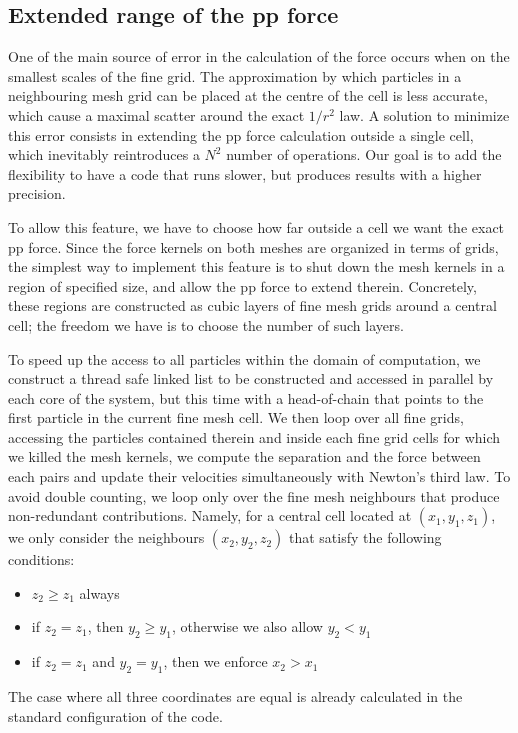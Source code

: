 \subsection{Extended range of the pp force}
\label{subsec:extendedpp}

One of the main source of error in the calculation of the force occurs when on the smallest scales of the fine grid.
The approximation by which particles in a neighbouring mesh grid can be placed at the centre of the cell
is less accurate, which cause a maximal scatter around the exact $1/r^2$ law.
A solution to minimize this error consists in extending the pp force calculation outside a single cell,
which inevitably reintroduces a $N^2$ number of operations. Our goal is to add the flexibility to have a code
that runs slower, but produces results with a higher precision. 

To allow this feature, we  have to choose how far outside a cell we want the exact pp force.  
Since the force kernels on both meshes are organized in terms of grids, the simplest way to implement this 
feature is to shut down the mesh kernels in a region of specified size, and allow the pp force to extend therein.
Concretely, these regions are constructed as cubic layers of fine mesh grids around a central cell; 
the freedom we have is to choose the number of such layers.
 
 To speed up the access to all particles within the domain of computation, we construct a thread safe linked list
 to be constructed and accessed in parallel by each core of the system, but this time with a head-of-chain that points to the first particle in the current fine mesh cell. We then loop over all fine grids, accessing the particles contained therein and inside each fine grid cells for which we killed the mesh kernels,
 we compute the separation and the force between each pairs and update their velocities simultaneously with Newton's third law. 
 To avoid double counting, we loop only over the fine mesh neighbours that produce non-redundant contributions. Namely, for a central cell located at 
 $(x_1, y_1, z_1)$, we only consider the neighbours $(x_2, y_2, z_2)$ that satisfy the following conditions:
 \begin{itemize}
 \item{$z_2 \ge z_1$ always}
 \item{if $z_2 = z_1$, then $y_2 \ge y_1$, otherwise we also allow $y_2 < y_1$} 
 \item{if $z_2 = z_1$ and $y_2 = y_1$, then we enforce $x_2 > x_1$}
 \end{itemize}
 The case where all three coordinates are equal is already calculated in the standard configuration of the code.
 
